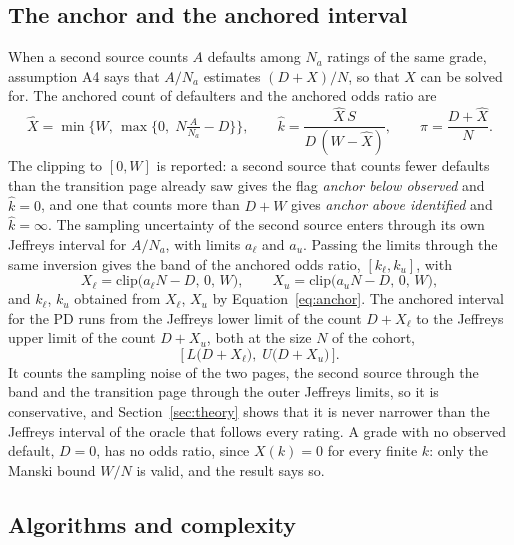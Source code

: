 \subsection{The anchor and the anchored interval}

When a second source counts $A$ defaults among $N_a$ ratings of the same grade, assumption A4 says that $A/N_a$ estimates $(D+X)/N$, so that $X$ can be solved for. The anchored count of \wdn{} defaulters and the anchored odds ratio are
\begin{equation}
\widehat X=\min\!\Big\{W,\,\max\big\{0,\;N\tfrac{A}{N_a}-D\big\}\Big\},\qquad \widehat k=\frac{\widehat X\,S}{D\,(W-\widehat X)},\qquad \widehat\pi=\frac{D+\widehat X}{N}.
\label{eq:anchor}
\end{equation}
The clipping to $[0,W]$ is reported: a second source that counts fewer defaults than the transition page already saw gives the flag \emph{anchor below observed} and $\widehat k=0$, and one that counts more than $D+W$ gives \emph{anchor above identified} and $\widehat k=\infty$. The sampling uncertainty of the second source enters through its own Jeffreys interval for $A/N_a$, with limits $a_{\ell}$ and $a_{u}$. Passing the limits through the same inversion gives the band of the anchored odds ratio, $[k_{\ell},k_{u}]$, with
\begin{equation}
X_{\ell}=\mathrm{clip}\big(a_{\ell}N-D,\,0,\,W\big),\qquad X_{u}=\mathrm{clip}\big(a_{u}N-D,\,0,\,W\big),
\label{eq:band}
\end{equation}
and $k_{\ell}$, $k_{u}$ obtained from $X_{\ell}$, $X_{u}$ by Equation~\eqref{eq:anchor}. The anchored interval for the PD runs from the Jeffreys lower limit of the count $D+X_{\ell}$ to the Jeffreys upper limit of the count $D+X_{u}$, both at the size $N$ of the cohort,
\begin{equation}
\Big[\,L\big(D+X_{\ell}\big),\;U\big(D+X_{u}\big)\,\Big].
\label{eq:interval}
\end{equation}
It counts the sampling noise of the two pages, the second source through the band and the transition page through the outer Jeffreys limits, so it is conservative, and Section~\ref{sec:theory} shows that it is never narrower than the Jeffreys interval of the oracle that follows every \wdn{} rating. A grade with no observed default, $D=0$, has no odds ratio, since $X(k)=0$ for every finite $k$: only the Manski bound $W/N$ is valid, and the result says so.

\subsection{Algorithms and complexity}


